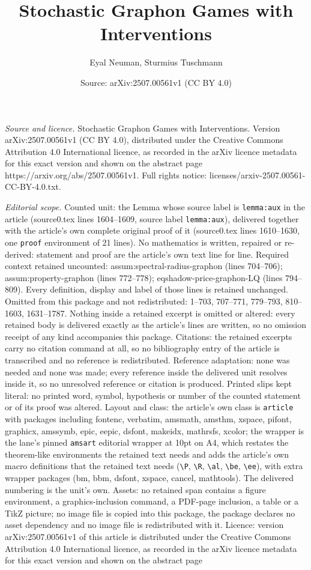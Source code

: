 \documentclass[10pt,a4paper]{amsart}
\title[Stochastic Graphon Games with Interventions]{Stochastic Graphon Games with Interventions}
\author{Eyal Neuman, Sturmius Tuschmann}
\date{Source: arXiv:2507.00561v1 (CC BY 4.0)}
\begin{document}
\maketitle

\noindent\emph{Source and licence.} Stochastic Graphon Games with Interventions. Version arXiv:2507.00561v1 (CC BY 4.0), distributed under the Creative Commons Attribution 4.0 International licence, as recorded in the arXiv licence metadata for this exact version and shown on the abstract page https://arxiv.org/abs/2507.00561v1. Full rights notice: licenses/arxiv-2507.00561-CC-BY-4.0.txt.\par\smallskip

\noindent\textit{Editorial scope.} Counted unit: the Lemma whose source label is \texttt{lemma:aux} in the article (source0.tex lines 1604--1609, source label \texttt{lemma:aux}), delivered together with the article's own complete original proof of it (source0.tex lines 1610--1630, one \texttt{proof} environment of 21 lines). No mathematics is written, repaired or re-derived: statement and proof are the article's own text line for line. Required context retained uncounted: assum:spectral-radius-graphon (lines 704--706); assum:property-graphon (lines 772--778); eqshadow-price-graphon-LQ (lines 794--809). Every definition, display and label of those lines is retained unchanged. Omitted from this package and not redistributed: 1--703, 707--771, 779--793, 810--1603, 1631--1787. Nothing inside a retained excerpt is omitted or altered: every retained body is delivered exactly as the article's lines are written, so no omission receipt of any kind accompanies this package. Citations: the retained excerpts carry no citation command at all, so no bibliography entry of the article is transcribed and no reference is redistributed. Reference adaptation: none was needed and none was made; every reference inside the delivered unit resolves inside it, so no unresolved reference or citation is produced. Printed slips kept literal: no printed word, symbol, hypothesis or number of the counted statement or of its proof was altered. Layout and class: the article's own class is \texttt{article} with packages including fontenc, verbatim, amsmath, amsthm, xspace, pifont, graphicx, amssymb, epic, eepic, dsfont, makeidx, mathrsfs, xcolor; the wrapper is the lane's pinned \texttt{amsart} editorial wrapper at 10pt on A4, which restates the theorem-like environments the retained text needs and adds the article's own macro definitions that the retained text needs (\texttt{\textbackslash P}, \texttt{\textbackslash R}, \texttt{\textbackslash al}, \texttt{\textbackslash be}, \texttt{\textbackslash ee}), with extra wrapper packages (bm, bbm, dsfont, xspace, cancel, mathtools). The delivered numbering is the unit's own. Assets: no retained span contains a figure environment, a graphics-inclusion command, a PDF-page inclusion, a table or a TikZ picture; no image file is copied into this package, the package declares no asset dependency and no image file is redistributed with it. Licence: version arXiv:2507.00561v1 of this article is distributed under the Creative Commons Attribution 4.0 International licence, as recorded in the arXiv licence metadata for this exact version and shown on the abstract page 
\end{document}
